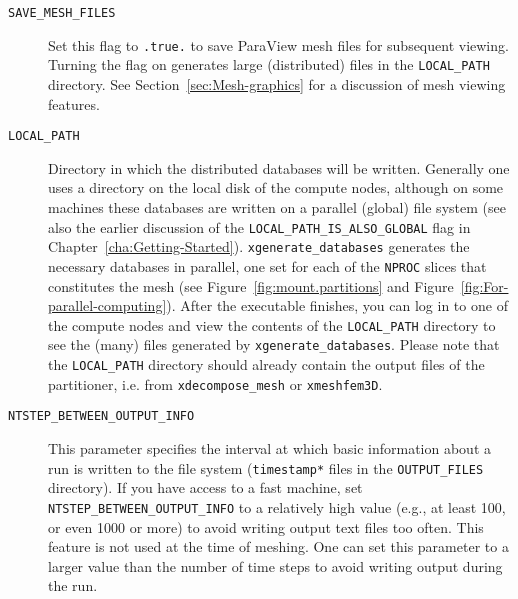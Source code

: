 \begin{description}
\item [{\texttt{SAVE\_MESH\_FILES}}] Set this flag to \texttt{.true.} to
save ParaView  mesh files for
subsequent viewing. Turning the flag on generates large (distributed)
files in the \texttt{LOCAL\_PATH} directory. See Section~\ref{sec:Mesh-graphics}
for a discussion of mesh viewing features.
\item [{\texttt{LOCAL\_PATH}}] Directory in which the distributed databases
will be written. Generally one uses a directory on the local disk
of the compute nodes, although on some machines these databases are
written on a parallel (global) file system (see also the earlier discussion
of the \texttt{LOCAL\_PATH\_IS\_ALSO\_GLOBAL} flag in Chapter~\ref{cha:Getting-Started}).
\texttt{xgenerate\_databases} generates the necessary databases in
parallel, one set for each of the \texttt{NPROC} slices that constitutes
the mesh (see Figure~\ref{fig:mount.partitions} and Figure~\ref{fig:For-parallel-computing}).
After the executable finishes, you can log in to one of the compute
nodes and view the contents of the \texttt{LOCAL\_PATH} directory
to see the (many) files generated by \texttt{xgenerate\_databases}.
Please note that the \texttt{LOCAL\_PATH} directory should already
contain the output files of the partitioner, i.e. from \texttt{xdecompose\_mesh}
or \texttt{xmeshfem3D}.
\item [{\texttt{NTSTEP\_BETWEEN\_OUTPUT\_INFO}}] This parameter specifies
the interval at which basic information about a run is written to
the file system (\texttt{timestamp{*}} files in the \texttt{OUTPUT\_FILES}
directory). If you have access to a fast machine, set \texttt{NTSTEP\_BETWEEN\_OUTPUT\_INFO}
to a relatively high value (e.g., at least 100, or even 1000 or more)
to avoid writing output text files too often. This feature is not
used at the time of meshing. One can set this parameter to a larger
value than the number of time steps to avoid writing output during
the run.
\end{description}

